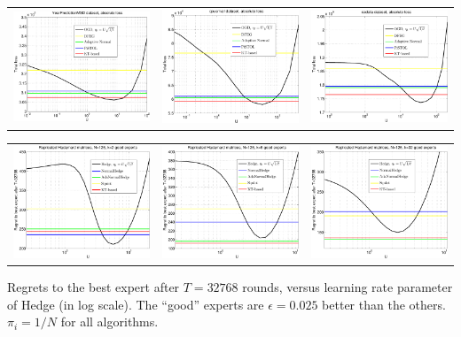 \documentclass[largefonts,landscape]{sciposter}
\begin{document}
\begin{multicols}{3}
\begin{tabular}{ccc}
\includegraphics[width=0.30\linewidth]{../NIPS-2016-camera-ready/figs/yearpredictionmsd_kt-crop.pdf} &
\includegraphics[width=0.30\linewidth]{../NIPS-2016-camera-ready/figs/cpusmall_kt-crop.pdf} &
\includegraphics[width=0.30\linewidth]{../NIPS-2016-camera-ready/figs/cadata_kt-crop.pdf}
\end{tabular}

\begin{tabular}{ccc}
\includegraphics[width=0.30\linewidth]{../NIPS-2016-camera-ready/figs/fig1-crop.pdf} &
\includegraphics[width=0.30\linewidth]{../NIPS-2016-camera-ready/figs/fig2-crop.pdf} & 
\includegraphics[width=0.30\linewidth]{../NIPS-2016-camera-ready/figs/fig3-crop.pdf}
\end{tabular}

\footnotesize{Regrets to the best expert after $T = 32768$ rounds,
versus learning rate parameter of Hedge (in log scale). The ``good'' experts
are $\epsilon=0.025$ better than the others. $\pi_i=1/N$ for all
algorithms.}

\end{multicols}
\end{document}
